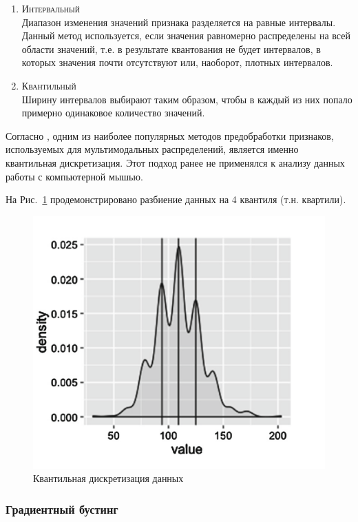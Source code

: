 \documentclass[12pt]{article}
\begin{document}
    \begin{enumerate}
        \item \textsc{Интервальный} \\
        Диапазон изменения значений признака разделяется на равные интервалы. Данный метод используется, если значения равномерно распределены на всей области значений, т.е. в результате квантования не будет интервалов, в которых значения почти отсутствуют или, наоборот, плотных интервалов.
        \item \textsc{Квантильный} \\
        Ширину интервалов выбирают таким образом, чтобы в каждый из них попало примерно одинаковое количество значений.
    \end{enumerate}

    \par Согласно \cite{Kazachuk}, одним из наиболее популярных методов предобработки признаков, используемых для мультимодальных распределений, является именно квантильная дискретизация. Этот подход ранее не применялся к анализу данных работы с компьютерной мышью.

    \par На Рис.~\ref{sec:Research:FeatureSpace:Quantile:fig:Quantile} продемонстрировано разбиение данных на 4 квантиля (т.н. квартили).

    \begin{figure}[h!]
        \centering
        \includegraphics[width=0.7\linewidth]{quantile.png}
        \caption{Квантильная дискретизация данных}
        \label{sec:Research:FeatureSpace:Quantile:fig:Quantile}
    \end{figure}


    \subsubsection{Градиентный бустинг}
    \label{sec:Research:FeatureSpace:GradientBoostingClassifier}
\end{document}
